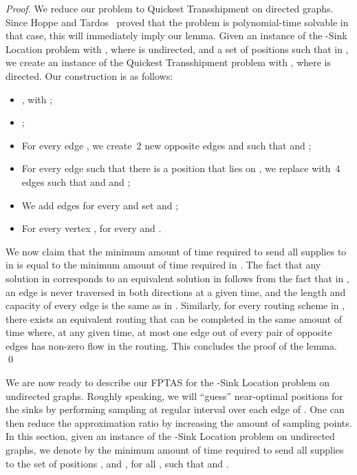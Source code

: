 \documentclass[a4paper,10pt]{llncs}
\begin{document}
\begin{proof}
We reduce our problem to {\sc Quickest Transshipment} on directed graphs. Since Hoppe and Tardos~\cite{HT00} proved that the problem is polynomial-time solvable in that case, this will immediately imply our lemma. Given an instance  of the -{\sc Sink Location} problem with , where  is undirected, and a set of positions  such that  in , we create an instance  of the {\sc Quickest Transshipment} problem with , where  is directed. Our construction is as follows:
\begin{itemize}
\item , with ;
\item ;
\item For every edge , we create~2 new opposite edges  and  such that  and ;
\item For every edge  such that there is a position  that lies on , we replace  with~4 edges  such that  and  and ;
\item We add edges  for every  and set  and ;
\item For every vertex ,  for every  and .
\end{itemize}
We now claim that the minimum amount of time required to send all supplies to  in  is equal to the minimum amount of time required in .
The fact that any solution in  corresponds to an equivalent solution in  follows from the fact that in , an edge is never traversed in both directions at a given time, and the length and capacity of every edge is the same as in . Similarly, for every routing scheme in , there exists an equivalent routing that can be completed in the same amount of time where, at any given time, at most one edge out of every pair of opposite edges has non-zero flow in the routing. This concludes the proof of the lemma.
\qed
\end{proof}

We are now ready to describe our FPTAS for the -{\sc Sink Location} problem on undirected graphs. Roughly speaking, we will ``guess'' near-optimal positions for the  sinks by performing sampling at regular interval over each edge of . One can then reduce the approximation ratio by increasing the amount of sampling points. In this section, given an instance of the -{\sc Sink Location} problem on undirected graphs, we denote by  the minimum amount of time required to send all supplies to the set of positions , and , for all , such that   and .
\end{document}
